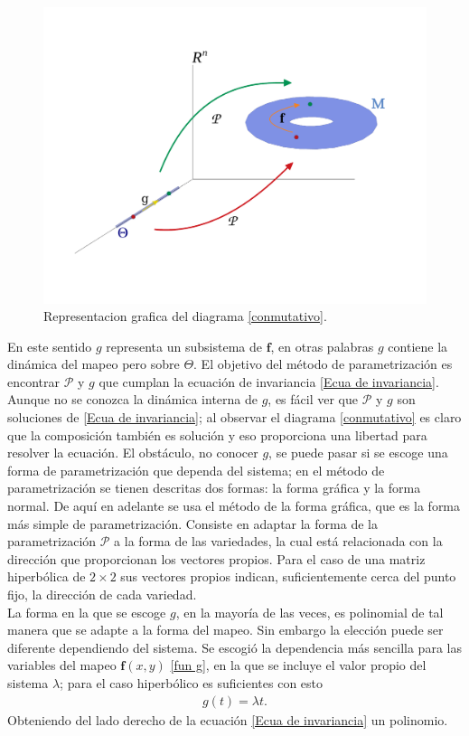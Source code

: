 \begin{figure}[h!]
	\centering
	\includegraphics[scale=0.4]{diagrama-conmutativo}
	\caption{Representacion grafica del diagrama \eqref{conmutativo}.}
	\label{diagrama-conmutativo}
\end{figure}


En este sentido $g$ representa un subsistema de $\mathbf{f}$, en otras palabras $g$ contiene la dinámica del mapeo pero sobre $\Theta$. El objetivo del método de parametrización es encontrar $\mathcal{P}$ y $g$ que cumplan la ecuación de invariancia \eqref{Ecua de invariancia}. Aunque no se conozca la dinámica interna de $g$, es fácil ver que $\mathcal{P}$ y $g$ son soluciones de \eqref{Ecua de invariancia}; al observar el diagrama \eqref{conmutativo} es claro que la composición también es solución y eso proporciona una libertad para resolver la ecuación. El obstáculo, no conocer $g$, se puede pasar si se escoge una forma de parametrización que dependa del sistema; en el método de parametrización se tienen descritas dos formas: la forma gráfica y la forma normal. De aquí en adelante se usa el método de la forma gráfica, que es la forma más simple de parametrización. Consiste en adaptar la forma de la parametrización $\mathcal{P}$ a la forma de las variedades, la cual está relacionada con la dirección que proporcionan los vectores propios. Para el caso de una matriz hiperbólica de $2\times 2$ sus vectores propios indican, suficientemente cerca del punto fijo, la dirección de cada variedad. \\


La forma en la que se escoge $g$, en la mayoría de las veces, es polinomial de tal manera que se adapte a la forma del mapeo. Sin embargo la elección puede ser diferente dependiendo del sistema. Se escogió la dependencia más sencilla para las variables del mapeo $\mathbf{f}(x,y)$ \eqref{fun g}, en la que se incluye el valor propio del sistema $\lambda$; para el caso hiperbólico es suficientes con esto
\begin{eqnarray}
g(t) = \lambda t.
\label{fun g}
\end{eqnarray}
Obteniendo del lado derecho de la ecuación \eqref{Ecua de invariancia} un polinomio. \\

